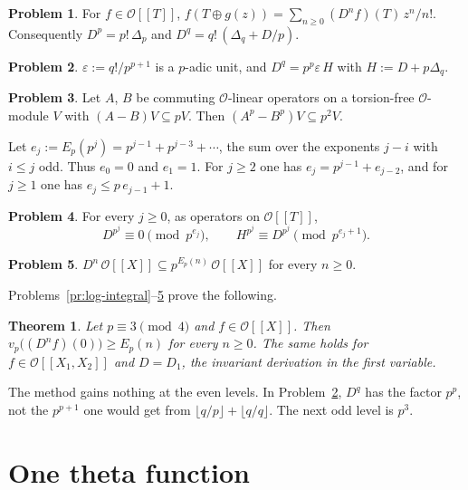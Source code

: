 \documentclass[reqno]{amsart}
\theoremstyle{definition}
\newtheorem{problem}{Problem}[section]
\theoremstyle{plain}
\newtheorem{theorem}{Theorem}[section]
\newcommand{\Oc}{\mathcal{O}}
\begin{document}
\begin{problem}\label{pr:Dq}
For \(f \in \Oc[[T]]\), \(f(T \oplus g(z)) = \sum_{n \ge 0} (D^n f)(T)\, z^n/n!\).  Consequently \(D^p = p!\, \Delta_p\) and \(D^q = q!\, (\Delta_q + D/p)\).
\end{problem}

\begin{problem}\label{pr:Dq-unit}
\(\varepsilon := q!/p^{p+1}\) is a \(p\)-adic unit, and \(D^q = p^p \varepsilon\, H\) with \(H := D + p\Delta_q\).
\end{problem}

\begin{problem}\label{pr:pth-powers}
Let \(A\), \(B\) be commuting \(\Oc\)-linear operators on a torsion-free \(\Oc\)-module \(V\) with \((A - B)V \subseteq pV\).  Then \((A^p - B^p)V \subseteq p^2V\).
\end{problem}

Let \(e_j := E_p(p^j) = p^{j-1} + p^{j-3} + \dotsb\), the sum over the exponents \(j - i\) with \(i \le j\) odd.  Thus \(e_0 = 0\) and \(e_1 = 1\).  For \(j \ge 2\) one has \(e_j = p^{j-1} + e_{j-2}\), and for \(j \ge 1\) one has \(e_j \le p\,e_{j-1} + 1\).

\begin{problem}\label{pr:induction}
For every \(j \ge 0\), as operators on \(\Oc[[T]]\),
\[
  D^{p^j} \equiv 0 \pmod{p^{e_j}},
  \qquad
  H^{p^j} \equiv D^{p^j} \pmod{p^{e_j + 1}} .
\]
\end{problem}

\begin{problem}\label{pr:digits}
\(D^n\, \Oc[[X]] \subseteq p^{E_p(n)}\, \Oc[[X]]\) for every \(n \ge 0\).
\end{problem}

Problems~\ref{pr:log-integral}--\ref{pr:digits} prove the following.

\begin{theorem}\label{thm:single}
Let \(p \equiv 3 \pmod 4\) and \(f \in \Oc[[X]]\).  Then \(v_p\bigl((D^n f)(0)\bigr) \ge E_p(n)\) for every \(n \ge 0\).  The same holds for \(f \in \Oc[[X_1, X_2]]\) and \(D = D_1\), the invariant derivation in the first variable.
\end{theorem}

The method gains nothing at the even levels.  In Problem~\ref{pr:Dq-unit}, \(D^q\) has the factor \(p^p\), not the \(p^{p+1}\) one would get from \(\lfloor q/p \rfloor + \lfloor q/q \rfloor\).  The next odd level is \(p^3\).

\section{One theta function}\label{sec:one-theta}
\end{document}
